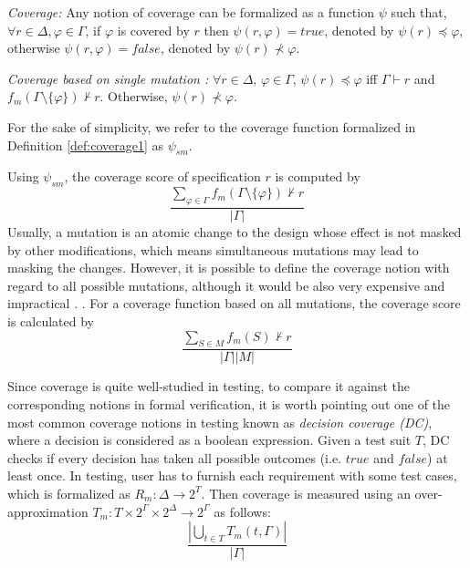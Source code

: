 \begin{definition}{\emph{Coverage:}}
  \label{def:coverage}
   Any notion of coverage can be formalized as a function $\psi$ such that,
   $\forall r \in \Delta, \varphi \in \Gamma$, if $\varphi$ is covered by $r$ then $\psi (r, \varphi) = true$, denoted by $\psi (r) \preccurlyeq \varphi$, otherwise  $\psi (r, \varphi) = false$, denoted by $\psi (r) \nprec \varphi$.
\end{definition}

\begin{definition} {\emph{Coverage based on single mutation \cite{chockler2010coverage, chockler_coverage_2003}:}}
  \label{def:coverage1}
   $\forall r \in \Delta$, 
   $\varphi \in \Gamma$, 
   $\psi (r) \preccurlyeq \varphi$ 
   iff $\Gamma \vdash r$ and
   $f_m (\Gamma \setminus \{ \varphi \}) \nvdash r$. Otherwise, $\psi (r) \nprec \varphi$.
\end{definition}

For the sake of simplicity, we refer to the coverage function 
formalized in Definition \ref{def:coverage1} as $\psi_{sm}$.

Using $\psi_{sm}$, the coverage score of specification $r$ is computed by $$\frac{\sum_{\varphi \in \Gamma} f_m (\Gamma \setminus \{ \varphi \}) \nvdash r}{|\Gamma|}$$
Usually, a mutation is an atomic change to the design whose effect is not masked by other modifications, which means simultaneous mutations may lead to masking the changes. However,
it is possible to define the coverage notion with regard to all possible mutations, although it would be also very expensive and impractical \cite{chockler2001practical}. .
For a coverage function based on all mutations, the coverage score is calculated by 
$$ \frac{\sum_{S \in M} f_m (S) \nvdash r}{|\Gamma| |M|}$$ 

Since coverage is quite well-studied in testing, to compare it against the corresponding notions in formal verification, it is worth pointing out one of the most common coverage notions in testing known as \emph{decision coverage (DC)}, where a decision is considered as a boolean expression.  Given a test suit $T$, DC checks if every decision has taken all possible outcomes (i.e. $true$ and $false$) at least once. In testing, user has to furnish each requirement with some test cases, which is formalized as $R_m : \Delta \rightarrow 2^T$. Then coverage is measured using an over-approximation $T_m : T \times 2^\Gamma \times 2^\Delta \rightarrow 2^\Gamma$ as follows: $$\frac{|\bigcup_{t \in T} T_m (t, \Gamma)|}{|\Gamma|}$$ 





